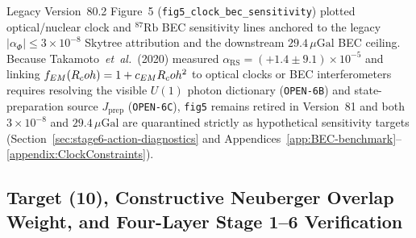 \begin{remark}
\label{rem:monograph-fig5-quarantine}
Legacy Version~80.2 Figure~5 (\texttt{fig5\_clock\_bec\_sensitivity}) plotted optical/nuclear clock and $^{87}\mathrm{Rb}$ BEC sensitivity lines anchored to the legacy $|\alpha_\Phi| \le 3\times 10^{-8}$ Skytree attribution and the downstream $29.4\,\mu\mathrm{Gal}$ BEC ceiling. Because Takamoto~\emph{et~al.}\ (2020) measured $\alpha_{\mathrm{RS}} = (+1.4 \pm 9.1)\times 10^{-5}$ and linking $f_{EM}(R_coh) = 1 + c_{EM}R_coh^2$ to optical clocks or BEC interferometers requires resolving the visible $U(1)$ photon dictionary (\texttt{OPEN-6B}) and state-preparation source $J_{\mathrm{prep}}$ (\texttt{OPEN-6C}), \texttt{fig5} remains retired in Version~81 and both $3\times 10^{-8}$ and $29.4\,\mu\mathrm{Gal}$ are quarantined strictly as hypothetical sensitivity targets (Section~\ref{sec:stage6-action-diagnostics} and Appendices~\ref{app:BEC-benchmark}--\ref{appendix:ClockConstraints}).
\end{remark}

\subsection{Target (10), Constructive Neuberger Overlap Weight, and Four-Layer Stage 1--6 Verification}

